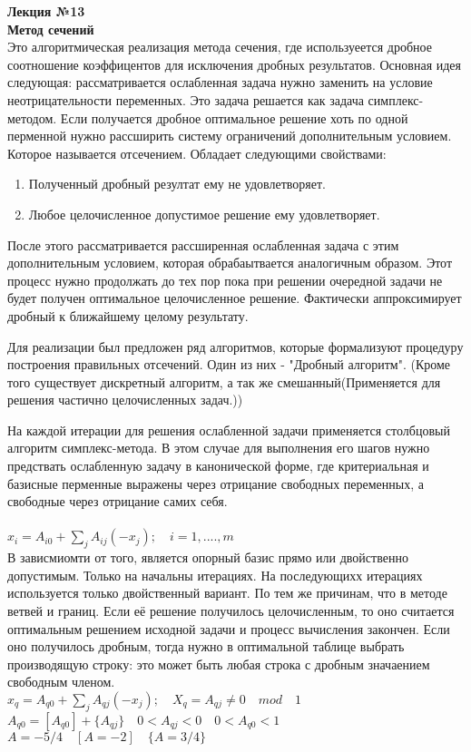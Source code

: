 

\LARGE{ \textbf {Лекция №13}}\\

\Large{ \textbf {Метод сечений}}\\

Это алгоритмическая реализация метода сечения, где используеется дробное соотношение коэффицентов для исключения дробных результатов.
Основная идея следующая: рассматривается ослабленная задача нужно заменить на условие неотрицательности переменных.
Это задача решается как задача симплекс-методом.
Если получается дробное оптимальное решение хоть по одной перменной нужно рассширить систему ограничений дополнительным условием.
Которое называется отсечением.
Обладает следующими свойствами:
\begin{enumerate}
  \item Полученный дробный резултат ему не удовлетворяет.
  \item Любое целочисленное допустимое решение ему удовлетворяет.
\end{enumerate}

После этого рассматривается рассширенная ослабленная задача с этим дополнительным условием, которая обрабаытвается аналогичным образом.
Этот процесс нужно продолжать до тех пор пока при решении очередной задачи не будет получен оптимальное целочисленное решение.
Фактически аппроксимирует дробный к ближайшему целому результату.

Для реализации был предложен ряд алгоритмов, которые формализуют процедуру построения правильных отсечений.
Один из них - "Дробный алгоритм". (Кроме того существует дискретный алгоритм,
а так же смешанный(Применяется для решения частично целочисленных задач.))

На каждой итерации для решения ослабленной задачи применяется столбцовый алгоритм симплекс-метода.
В этом случае для выполнения его шагов нужно предствать ослабленную задачу в канонической форме, где критериальная и базисные перменные
выражены через отрицание свободных переменных, а свободные через отрицание самих себя.\\
\\
$x_i = A_{i0} + \sum \limits_j A_{ij}(-x_j); \quad i = 1,....,m $\\

В зависмиомти от того, является опорный базис прямо или двойственно допустимым. Только на начальны итерациях.
На последующихх итерациях используется только двойственный вариант. По тем же причинам, что в методе ветвей и границ.
Если её решение получилось целочисленным, то оно считается оптимальным решением исходной задачи и процесс вычисления закончен.
Если оно получилось дробным, тогда нужно в оптимальной таблице выбрать производящую строку:
это может быть любая строка  с дробным значаением свободным членом.\\
$x_q = A_{q0} + \sum \limits_j A_{qj}(-x_j); \quad X_q = A_{qj} \neq 0 \quad mod \quad 1 $\\
$A_{q0} = [A_{q0}] + \{ A_{qj} \}  \quad  0<A_{qj}<0 \quad 0< A_{q0} <1 $\\
$A = - 5/4 \quad [A=-2] \quad \{A = 3/4 \} $ \\

